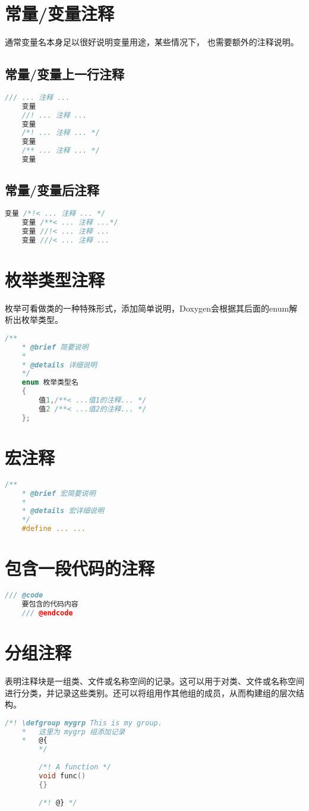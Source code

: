 \section{常量/变量注释}
\qquad 通常变量名本身足以很好说明变量用途，某些情况下， 也需要额外的注释说明。
\subsection{常量/变量上一行注释} 
\begin{lstlisting}[language=C++, label=lst:cpp]
	/// ... 注释 ... 
	变量
	//! ... 注释 ... 
	变量
	/*! ... 注释 ... */
	变量
	/** ... 注释 ... */
	变量
\end{lstlisting}
\subsection{常量/变量后注释}
\begin{lstlisting}[language=C++, label=lst:cpp]
	变量 /*!< ... 注释 ... */
	变量 /**< ... 注释 ...*/
	变量 //!< ... 注释 ...
	变量 ///< ... 注释 ...
\end{lstlisting}
\section{枚举类型注释}
\qquad 枚举可看做类的一种特殊形式，添加简单说明，Doxygen会根据其后面的enum解析出枚举类型。
\begin{lstlisting}[language=C++, label=lst:cpp]
	/**
	* @brief 简要说明
	*
	* @details 详细说明
	*/
	enum 枚举类型名
	{
		值1,/**< ...值1的注释... */
		值2 /**< ...值2的注释... */
	};
\end{lstlisting}
\section{宏注释}
\begin{lstlisting}[language=C++, label=lst:cpp]
	/**
	* @brief 宏简要说明
	* 
	* @details 宏详细说明
	*/
	#define ... ...
\end{lstlisting}
\section{包含一段代码的注释}
\begin{lstlisting}[language=C++, label=lst:cpp]
	/// @code
	要包含的代码内容
	/// @endcode
\end{lstlisting}
\section{分组注释}
\qquad 表明注释块是一组类、文件或名称空间的记录。这可以用于对类、文件或名称空间进行分类，并记录这些类别。还可以将组用作其他组的成员，从而构建组的层次结构。
\begin{lstlisting}[language=C++, label=lst:cpp]
	/*! \defgroup mygrp This is my group.
	* 	这里为 mygrp 组添加记录
	* 	@{
		*/ 
		
		/*! A function */
		void func()
		{}
		
		/*! @} */
\end{lstlisting}
